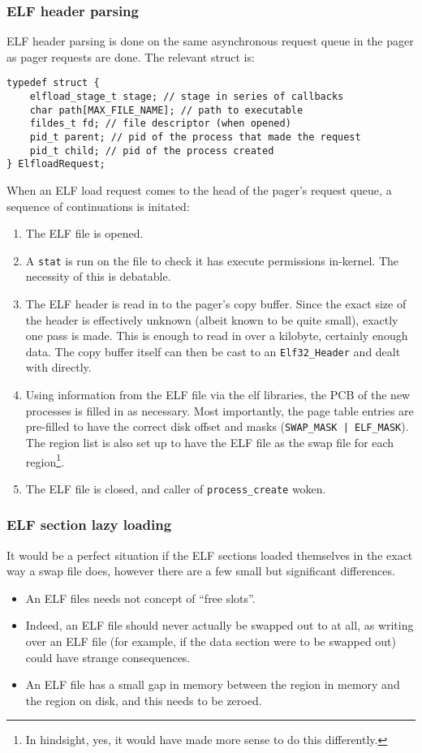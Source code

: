 \documentclass[12pt,english]{article}
\begin{document}
\subsubsection{ELF header parsing}

ELF header parsing is done on the same asynchronous request queue in the pager as pager requests are done.  The relevant struct is:

\begin{verbatim}
typedef struct {
    elfload_stage_t stage; // stage in series of callbacks
    char path[MAX_FILE_NAME]; // path to executable
    fildes_t fd; // file descriptor (when opened)
    pid_t parent; // pid of the process that made the request
    pid_t child; // pid of the process created
} ElfloadRequest;
\end{verbatim}

When an ELF load request comes to the head of the pager's request queue, a sequence of continuations is initated:
\begin{enumerate}
\item The ELF file is opened.
\item A \texttt{stat} is run on the file to check it has execute permissions in-kernel.  The necessity of this is debatable.
\item The ELF header is read in to the pager's copy buffer.  Since the exact size of the header is effectively unknown (albeit known to be quite small), exactly one pass is made.  This is enough to read in over a kilobyte, certainly enough data.  The copy buffer itself can then be cast to an \texttt{Elf32\_Header} and dealt with directly.
\item Using information from the ELF file via the elf libraries, the PCB of the new processes is filled in as necessary.  Most importantly, the page table entries are pre-filled to have the correct disk offset and masks (\texttt{SWAP\_MASK | ELF\_MASK}).  The region list is also set up to have the ELF file as the swap file for each region\footnote{In hindsight, yes, it would have made more sense to do this differently.}.
\item The ELF file is closed, and caller of \texttt{process\_create} woken.
\end{enumerate}

\subsubsection{ELF section lazy loading}

It would be a perfect situation if the ELF sections loaded themselves in the exact way a swap file does, however there are a few small but significant differences.
\begin{itemize}
\item An ELF files needs not concept of ``free slots''.
\item Indeed, an ELF file should never actually be swapped out to at all, as writing over an ELF file (for example, if the data section were to be swapped out) could have strange consequences.
\item An ELF file has a small gap in memory between the region in memory and the region on disk, and this needs to be zeroed.
\end{itemize}
\end{document}
